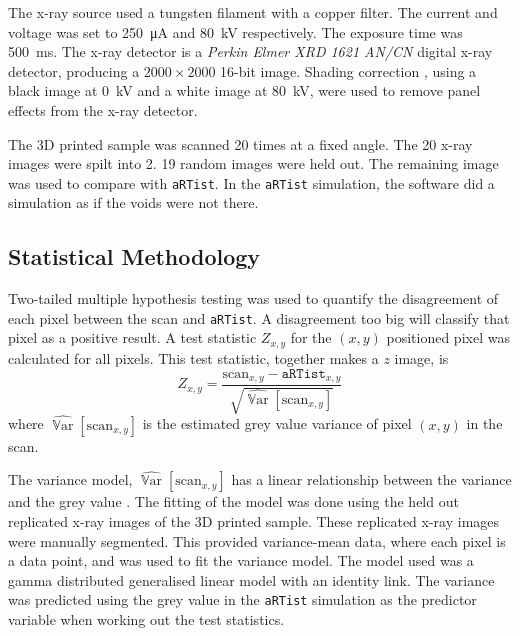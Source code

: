 \documentclass{proc}
\DeclareMathOperator{\variance}{\mathbb{V}ar}
\begin{document}
The x-ray source used a tungsten filament with a copper filter. The current and voltage was set to \SI{250}{\micro\ampere} and \SI{80}{\kilo\volt} respectively. The exposure time was \SI{500}{\milli\second}. The x-ray detector is a \emph{Perkin Elmer XRD 1621 AN/CN} digital x-ray detector, producing a $2000\times 2000$ 16-bit image. Shading correction \citep{young2000shading, munzenmayer2003enhancing}, using a black image at \SI{0}{\kilo\volt} and a white image at \SI{80}{\kilo\volt}, were used to remove panel effects from the x-ray detector.

The 3D printed sample was scanned 20 times at a fixed angle. The 20 x-ray images were spilt into 2. 19 random images were held out. The remaining image was used to compare with \texttt{aRTist}. In the \texttt{aRTist} simulation, the software did a simulation as if the voids were not there.

\subsection{Statistical Methodology}

Two-tailed multiple hypothesis testing \citep{pearson1900on, neyman1933on, fisher1970statistical} was used to quantify the disagreement of each pixel between the scan and \texttt{aRTist}. A disagreement too big will classify that pixel as a positive result. A test statistic $Z_{x,y}$ for the $(x,y)$ positioned pixel was calculated for all pixels. This test statistic, together makes a $z$ image, is
\begin{equation}
  Z_{x,y} = 
  \dfrac{
    \text{scan}_{x,y} - \texttt{aRTist}_{x,y}
  }
  {
    \sqrt{\widehat{\variance}\left[\text{scan}_{x,y}\right]}
  }
\end{equation}
where $\widehat{\variance}\left[\text{scan}_{x,y}\right]$ is the estimated grey value variance of pixel $(x,y)$ in the scan.

The variance model, $\widehat{\variance}\left[\text{scan}_{x,y}\right]$ has a linear relationship between the variance and the grey value \citep{yang2010noise}. The fitting of the model was done using the held out replicated x-ray images of the 3D printed sample. These replicated x-ray images were manually segmented. This provided variance-mean data, where each pixel is a data point, and was used to fit the variance model. The model used was a gamma distributed generalised linear model \citep{nelder1972generalized, mccullagh1984generalized} with an identity link. The variance was predicted using the grey value in the \texttt{aRTist} simulation as the predictor variable when working out the test statistics.
\end{document}
